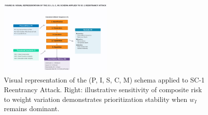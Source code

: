 \begin{figure}[H]
\centering
\includegraphics[width=0.5\textwidth]{../figure/fig3.png}
\caption{Visual representation of the (P, I, S, C, M) schema applied to SC-1 Reentrancy Attack. Right: illustrative sensitivity of composite risk to weight variation demonstrates prioritization stability when \(w_I\) remains dominant.}
\label{fig:schema_blueprint}
\end{figure}

